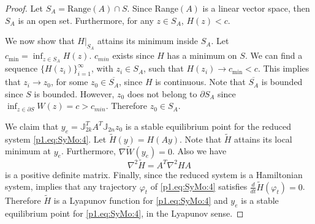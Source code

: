 {\begin{proof}
Let $S_A = \text{Range}(A)\cap S$. Since Range$(A)$ is a linear vector space, then $S_A$ is an open set. Furthermore, for any $z\in S_A$, $H(z) < c$. 
		
We now show that $H|_{S_A}$ attains its minimum inside $S_A$. Let $c_{\text{min}} = \inf_{z\in S_A} H(z)$. $c_{min}$ exists since $H$ has a minimum on $S$. We can find a sequence $\{ H(z_i) \}_{i=1}^\infty$, with $z_i\in S_A$, such that $H(z_i)\to c_{\text{min}} < c$. This implies that $z_i\to z_0$, for some $z_0\in \overline {S_A}$, since $H$ is continuous. Note that $\overline {S_A}$ is bounded since $S$ is bounded. However, $z_0$ does not belong to $\partial S_A$ since $\inf_{z\in \partial S} W(z)=c > c_{min}$. Therefore $z_0 \in S_A$. 

We claim that $y_e = \mathbb J_{2k}^T A^T \mathbb J_{2n} z_0$ is a stable equilibrium point for the reduced system \eqref{p1.eq:SyMo:4}. Let $\tilde H(y) = H(Ay)$. Note that $\tilde H$ attains its local minimum at $y_e$. Furthermore, $\nabla \tilde W(y_e) = 0$. Also we have
\begin{equation}
	\nabla^2 \tilde H = A^T \nabla^2 H A
\end{equation}
is a positive definite matrix. Finally, since the reduced system is a Hamiltonian system,  implies that any trajectory $\varphi_t$ of \eqref{p1.eq:SyMo:4} satisfies $\frac{d}{dt} \tilde H(\varphi_t) = 0$. Therefore $\tilde H$ is a Lyapunov function for \eqref{p1.eq:SyMo:4} and $y_e$ is a stable equilibrium point for \eqref{p1.eq:SyMo:4}, in the Lyapunov sense.

\end{proof}
}



